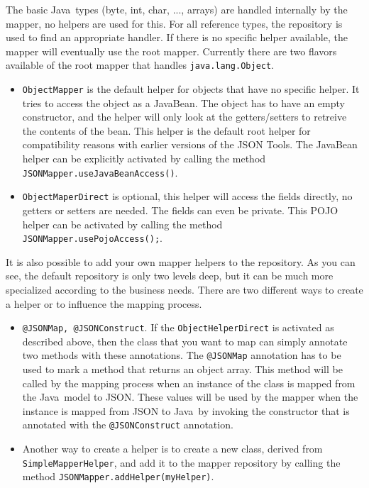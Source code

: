 \documentclass[a4paper]{article}
\newcommand{\jtools}{JSON Tools}
\newcommand{\java}{Java}
\begin{document}
The basic \java\ types (byte, int, char, ..., arrays) are handled internally by the mapper, no helpers are used for this. For all reference types, the repository is used to find an appropriate handler. If there is no specific helper available, the mapper will eventually use the root mapper. Currently there are two flavors available of the root mapper that handles \lstinline{java.lang.Object}.

\begin{itemize}
   \item \lstinline{ObjectMapper} is the default helper for objects that have no specific helper. It tries to access the object as a JavaBean. The object has to have an empty constructor, and the helper will only look at the getters/setters to retreive the contents of the bean. This helper is the default root helper for compatibility reasons with earlier versions of the \jtools. The JavaBean helper can be explicitly activated by calling the method \lstinline{JSONMapper.useJavaBeanAccess()}.
   \item \lstinline{ObjectMaperDirect} is optional, this helper will access the fields directly, no getters or setters are needed. The fields can even be private. This POJO helper can be activated by calling the method \lstinline{JSONMapper.usePojoAccess();}.
\end{itemize}

It is also possible to add your own mapper helpers to the repository. As you can see, the default repository is only two levels deep, but it can be much more specialized according to the business needs. There are two different ways to create a helper or to influence the mapping process.

\begin{itemize}
   \item \lstinline{@JSONMap, @JSONConstruct}. If the \lstinline{ObjectHelperDirect} is activated as described above, then the class that you want to map can simply annotate two methods with these annotations. The \lstinline{@JSONMap} annotation has to be used to mark a method that returns an object array. This method will be called by the mapping process when an instance of the class is mapped from the \java\ model to JSON. These values will be used by the mapper when the instance is mapped from JSON to \java\ by invoking the constructor that is annotated with the \lstinline{@JSONConstruct} annotation.
   \item Another way to create a helper is to create a new class, derived from \lstinline{SimpleMapperHelper}, and add it to the mapper repository by calling the method \lstinline{JSONMapper.addHelper(myHelper)}.
\end{itemize}
\end{document}

